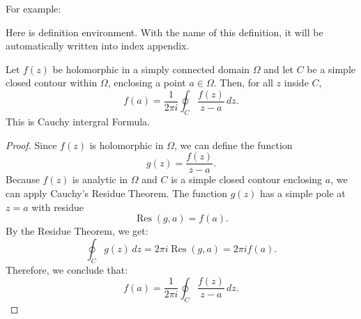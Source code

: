         For example:
        \begin{definition}
            Here is definition environment. With the name of this definition, it will be automatically written into index appendix.
        \end{definition}
        \lipsum[1-3]
        \begin{theorem}
            Let $f(z)$ be holomorphic in a simply connected domain $\Omega$ and let $C$ be a simple closed contour within $\Omega$, enclosing a point $a \in \Omega$. Then, for all $z$ inside $C$,
            \[
            f(a) = \frac{1}{2\pi i} \oint_C \frac{f(z)}{z-a} \, dz.
            \]
            This is Cauchy intergral Formula.
        \end{theorem}
        \begin{proof}
            Since $f(z)$ is holomorphic in $\Omega$, we can define the function
            \[
            g(z) = \frac{f(z)}{z-a}.
            \]
            Because $f(z)$ is analytic in $\Omega$ and $C$ is a simple closed contour enclosing $a$, we can apply Cauchy's Residue Theorem. The function $g(z)$ has a simple pole at $z=a$ with residue
            \[
            \operatorname{Res}(g, a) = f(a).
            \]
            By the Residue Theorem, we get:
            \[
            \oint_C g(z) \, dz = 2\pi i \operatorname{Res}(g, a) = 2\pi i f(a).
            \]
            Therefore, we conclude that:
            \[
            f(a) = \frac{1}{2\pi i} \oint_C \frac{f(z)}{z-a} \, dz.
            \]
        \end{proof}
        \lipsum[12-16]